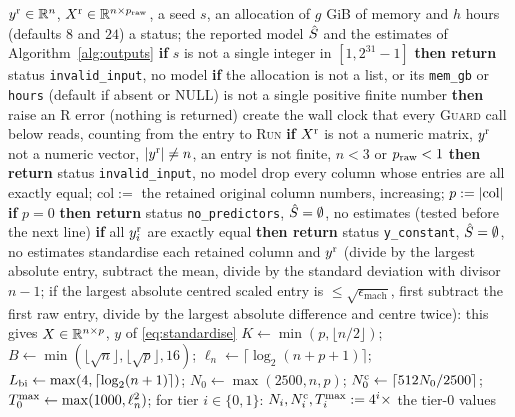 \begin{algorithm}
\caption{\textsc{Run}: a complete run (stage~1, and the order and the statuses of stages 2--7).}\label{alg:run}
{\scriptsize
\begin{algorithmic}[1]
\Require $y^{\mathrm r}\in\mathbb{R}^n$, $X^{\mathrm r}\in\mathbb{R}^{n\times p_{\mathrm{raw}}}$, a seed $s$, an allocation of $g$ GiB of memory and $h$ hours (defaults $8$ and $24$)
\Ensure a status; the reported model $\hat S$ and the estimates of Algorithm~\ref{alg:outputs}
\State \textbf{if} $s$ is not a single integer in $[1,2^{31}-1]$ \textbf{then return} status \texttt{invalid\_input}, no model %
\State \textbf{if} the allocation is not a list, or its \texttt{mem\_gb} or \texttt{hours} (default if absent or NULL) is not a single positive finite number \textbf{then} raise an R error (nothing is returned) %
\State\label{ln:run-clock} create the wall clock that every \textsc{Guard} call below reads, counting from the entry to \textsc{Run} %
\State \textbf{if} $X^{\mathrm r}$ is not a numeric matrix, $y^{\mathrm r}$ not a numeric vector, $\lvert y^{\mathrm r}\rvert\ne n$, an entry is not finite, $n<3$ or $p_{\mathrm{raw}}<1$ \textbf{then return} status \texttt{invalid\_input}, no model %
\State drop every column whose entries are all exactly equal; $\mathrm{col}:=$ the retained original column numbers, increasing; $p:=\lvert \mathrm{col}\rvert$ %
\State \textbf{if} $p=0$ \textbf{then return} status \texttt{no\_predictors}, $\hat S=\emptyset$, no estimates (tested before the next line) %
\State \textbf{if} all $y^{\mathrm r}_i$ are exactly equal \textbf{then return} status \texttt{y\_constant}, $\hat S=\emptyset$, no estimates %
\State standardise each retained column and $y^{\mathrm r}$ (divide by the largest absolute entry, subtract the mean, divide by the standard deviation with divisor $n-1$; if the largest absolute centred scaled entry is $\le\sqrt{\epsilon_{\mathrm{mach}}}$, first subtract the first raw entry, divide by the largest absolute difference and centre twice): this gives $X\in\mathbb{R}^{n\times p}$, $y$ of \eqref{eq:standardise} %
\State $K\gets\min(p,\lfloor n/2\rfloor)$; $B\gets\min(\lfloor\sqrt n\rfloor,\lfloor\sqrt p\rfloor,16)$; $\ell_n\gets\lceil\log_2(n+p+1)\rceil$; $L_{\mathrm{bi}}\gets\max(4,\lceil\log_2(n+1)\rceil)$; $N_0\gets\max(2500,n,p)$; $N^{\mathrm c}_0\gets\lceil512N_0/2500\rceil$; $T^{\max}_0\gets\max(1000,\ell_n^2)$; for tier $i\in\{0,1\}$: $N_i,N^{\mathrm c}_i,T^{\max}_i:=4^i\times$ the tier-$0$ values %

\end{algorithmic}}
\end{algorithm}
